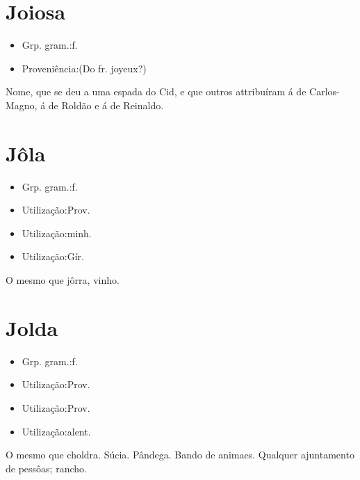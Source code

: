 \documentclass{article}
\begin{document}
\section{Joiosa}
\begin{itemize}
\item {Grp. gram.:f.}
\end{itemize}
\begin{itemize}
\item {Proveniência:(Do fr. \textunderscore joyeux\textunderscore ?)}
\end{itemize}
Nome, que se deu a uma espada do Cid, e que outros attribuíram á de Carlos-Magno, á de Roldão e á de Reinaldo.
\section{Jôla}
\begin{itemize}
\item {Grp. gram.:f.}
\end{itemize}
\begin{itemize}
\item {Utilização:Prov.}
\end{itemize}
\begin{itemize}
\item {Utilização:minh.}
\end{itemize}
\begin{itemize}
\item {Utilização:Gír.}
\end{itemize}
O mesmo que \textunderscore jôrra\textunderscore , vinho.
\section{Jolda}
\begin{itemize}
\item {Grp. gram.:f.}
\end{itemize}
\begin{itemize}
\item {Utilização:Prov.}
\end{itemize}
\begin{itemize}
\item {Utilização:Prov.}
\end{itemize}
\begin{itemize}
\item {Utilização:alent.}
\end{itemize}
O mesmo que \textunderscore choldra\textunderscore .
Súcia.
Pândega.
Bando de animaes.
Qualquer ajuntamento de pessôas; rancho.
\end{document}
